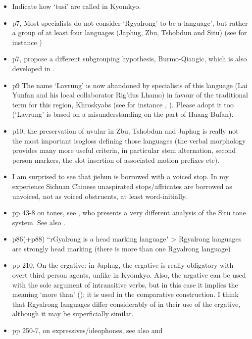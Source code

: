\documentclass[oldfontcommands,oneside,a4paper,11pt]{article}
\begin{document}
\begin{itemize}
\item Indicate how `tusi' are called in Kyomkyo.
\item p7, Most specialists do not consider `Rgyalrong' to be a  language', but rather a group of at least four languages (Japhug, Zbu, Tshobdun and Situ) (see for instance \citealt[195]{jacques13harmonization})
\item p7, \citet{jacques.michaud11naish} propose a different subgrouping hypothesis, Burmo-Qiangic, which is also developed in \citet{jacques14esquisse}.
\item p9 The name `Lavrung' is now abandoned by specialists of this language (Lai Yunfan and his local collaborator Rig'dus Lhamo) in favour of the traditional term for this region, Khroskyabs (see for instance \citealt{delancey14second}, \citealt{jacques14inverse}). Please adopt it too (`Lavrung' is based on a misunderstanding on the part of Huang Bufan).
\item p10, the preservation of uvular in Zbu, Tshobdun and Japhug is really not the most important isogloss defining those languages (the verbal morphology provides many more useful criteria, in particular stem alternation, second person markers, the slot insertion of associated motion prefixes etc).
\item I am surprised to see that jiehun is borrowed with a voiced stop. In my experience Sichuan Chinese unaspirated stops/affricates are borrowed as unvoiced, not as voiced obstruents, at least word-initially.
\item pp 43-8 on tones, see \citet{linyj12tone}, who presents a very different analysis of the Situ tone system. See also \citet{jackson05yingao.zh}.
\item p86(+p88) ``rGyalrong is a head marking language" > Rgyalrong languages are strongly head marking (there is more than one Rgyalrong language)
\item pp 210, On the ergative: in Japhug, the ergative is really obligatory with overt third person agents, unlike in Kyomkyo. Also, the argative can be used with the sole argument of intransitive verbs, but in this case it implies the meaning `more than' (\citet[202]{jacques12demotion}); it is used in the comparative construction. I think that Rgyalrong languages differ considerably of in their use of the ergative, although it may be superficially similar.
\item pp 250-7, on expressives/ideophones, see also \citet{japhug14ideophones} and \citet{jackson14morpho}

\end{itemize}
\end{document}
